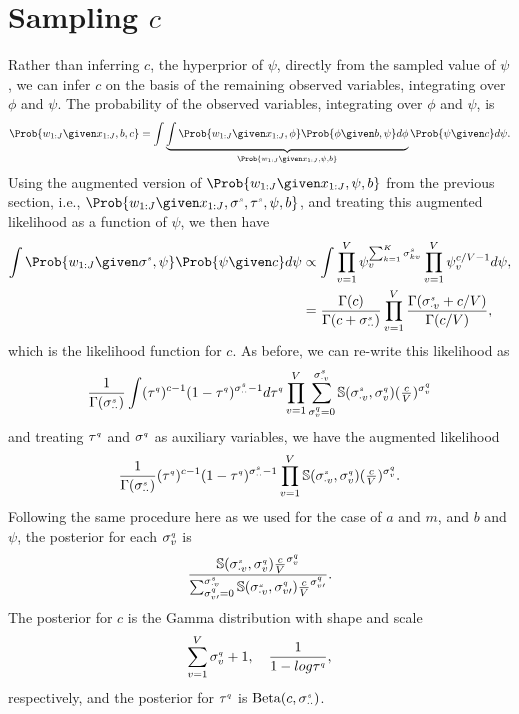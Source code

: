 \section{Sampling $\mathit{c}$}

Rather than inferring $c$, the hyperprior of $\psi$, directly from the
sampled value of $\psi$, we can infer $c$ on the basis of the remaining observed variables,
integrating over $\phi$ and $\psi$. The probability of the observed variables,
integrating over $\phi$ and $\psi$, is
\[
	\Prob{w_{1:J} \given x_{1:J}, b, c}
	=
	\int	
	\underbrace{\int \Prob{w_{1:J}\given x_{1:J}, \phi}\Prob{\phi\given b, \psi} d\phi}_{\Prob{w_{1:J}\given x_{1:J},\psi,b}}
	\Prob{\psi \given c}  d\psi.
\]
Using the augmented version of $\Prob{w_{1:J}\given x_{1:J},\psi,b}$ from the
previous section, i.e., $\Prob{w_{1:J}\given
x_{1:J},\stirS{s},\stirT{s},\psi,b}$, and treating this augmented likelihood as a function of
$\psi$, we then have
\begin{align*}
	\int
	\Prob{w_{1:J}\given \stirS{s},\psi}\Prob{\psi \given c}
	d\psi
	&\propto
	\int
	\prod_{v=1}^V \psi_{v}^{\sum_{k=1}^K \stirs{s}{kv}} 
	\prod_{v=1}^V \psi_{v}^{c/V -1}
	d\psi,\\
	&=
	\frac{\Gamma(c)}{\Gamma(c+\stirs{s}{\cdot\cdot})}\prod_{v=1}^V\frac{\Gamma(\stirs{s}{\cdot v} + c/V)}{\Gamma(c/V)},
\end{align*}
which is the likelihood function for $c$. As before, we can re-write this likelihood as 
\[
	\frac{1}{\Gamma(\sigma^{\text{\tiny{$s$}}}_{\cdot\cdot})} \int (\tau^{\text{\tiny{$q$}}}_{})^{c-1} (1-\tau^{\text{\tiny{$q$}}}_{})^{\sigma^{\text{\tiny{$s$}}}_{\cdot\cdot}-1} d\tau^{\text{\tiny{$q$}}}_{}
	\prod_{v=1}^V
	\sum_{\sigma^{\text{\tiny{$q$}}}_{v}=0}^{\sigma^{\text{\tiny{$s$}}}_{\cdot v}}
	\mathbb{S}(\sigma^{\text{\tiny{$s$}}}_{\cdot v},\sigma^{\text{\tiny{$q$}}}_{v})(\tfrac{c}{V})^{\sigma^{\text{\tiny{$q$}}}_{v}}
\]
and treating $\tau^{\text{\tiny{$q$}}}$ and $\sigma^{\text{\tiny{$q$}}}$ as auxiliary variables, we have the augmented likelihood
\[
	\frac{1}{\Gamma(\sigma^{\text{\tiny{$s$}}}_{\cdot\cdot})} (\tau^{\text{\tiny{$q$}}}_{})^{c-1} (1-\tau^{\text{\tiny{$q$}}}_{})^{\sigma^{\text{\tiny{$s$}}}_{\cdot\cdot}-1}
	\prod_{v=1}^V
	\mathbb{S}(\sigma^{\text{\tiny{$s$}}}_{\cdot v},\sigma^{\text{\tiny{$q$}}}_{v})(\tfrac{c}{V})^{\sigma^{\text{\tiny{$q$}}}_{v}}.
\]
Following the same procedure here as we used for the case of $a$ and $m$, and $b$ and $\psi$, the posterior for each $\sigma^{\text{\tiny{$q$}}}_{v}$ is
\[
\frac{ \mathbb{S}(\sigma^{\text{\tiny{$s$}}}_{\cdot v},\sigma^{\text{\tiny{$q$}}}_{v})\frac{c}{V}^{\sigma^{\text{\tiny{$q$}}}_{v}} } { \sum_{\sigma^{\text{\tiny{$q$}}}_{v\prime}=0}^{\sigma^{\text{\tiny{$s$}}}_{\cdot v}}\mathbb{S}(\sigma^{\text{\tiny{$s$}}}_{\cdot v},\sigma^{\text{\tiny{$q$}}}_{v\prime})\frac{c}{V}^{\sigma^{\text{\tiny{$q$}}}_{v\prime}} } .
\]
The posterior for $c$ is the Gamma distribution with shape and scale 
\[
\sum_{v=1}^V\sigma^{\text{\tiny{$q$}}}_{v} + 1,\quad \frac{1}{1 - log\tau^{\text{\tiny{$q$}}}_{}},
\]
respectively, and the posterior for $\tau^{\text{\tiny{$q$}}}_{}$ is $\textrm{Beta}(c,\sigma^{\text{\tiny{$s$}}}_{\cdot\cdot})$.
